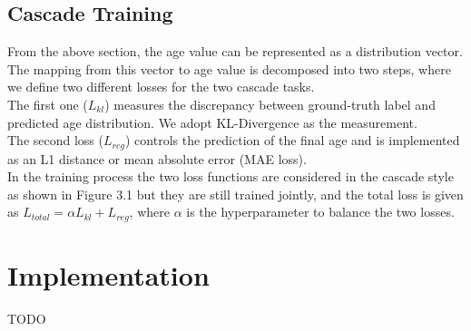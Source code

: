 \subsection*{Cascade Training}
From the above section, the age value can be represented as a distribution vector. The mapping from this 
vector to age value is decomposed into two steps, where we define two different losses for the two cascade 
tasks.\\
The first one ($L_{kl}$) measures the discrepancy between ground-truth label and predicted age distribution.
We adopt KL-Divergence as the measurement.\\
The second loss ($L_{reg}$) controls the prediction of the final age and is implemented as an L1 distance
or mean absolute error (MAE loss).\\
In the training process the two loss functions are considered in the cascade style as shown in Figure 3.1 
but they are still trained jointly, and the total loss is given as
$L_{total} = \alpha L_{kl} + L_{reg}$, where $\alpha$ is the hyperparameter to balance the two losses.

\section{Implementation}
TODO